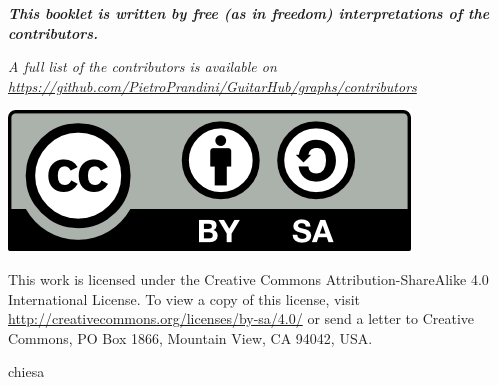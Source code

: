 


\begin{center}
	{\textit{\textbf{This booklet is written by free (as in freedom) interpretations of the contributors.}}}\par
\end{center}
\begin{center}
	{\textit{\footnotesize{A full list of the contributors is available on \href{https://github.com/PietroPrandini/GuitarHub/graphs/contributors}{https://github.com/PietroPrandini/GuitarHub/graphs/contributors}}}}\par
\end{center}
\begin{center}
	\includegraphics[scale=0.5]{img/cc-by-sa_88x31} \par
	{\footnotesize{This work is licensed under the Creative Commons Attribution-ShareAlike 4.0 International License. To view a copy of this license, visit \href{http://creativecommons.org/licenses/by-sa/4.0/}{http://creativecommons.org/licenses/by-sa/4.0/} or send a letter to Creative Commons, PO Box 1866, Mountain View, CA 94042, USA.}}\par
\end{center}
\newpage

\checkodd
{}

\checkodd
{}
\newpage
\begin{songs}{chiesa}
	
\end{songs}


